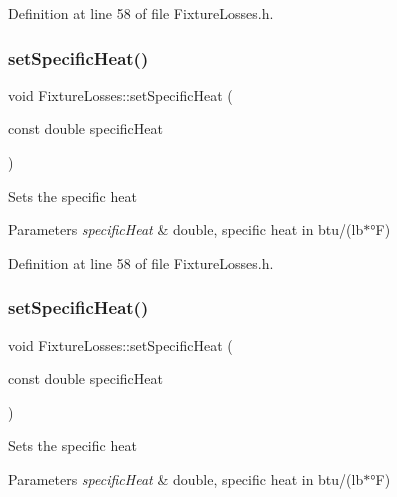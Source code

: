 Definition at line 58 of file Fixture\+Losses.\+h.

\mbox{\label{class_fixture_losses_a946e4b6da1cca9f27e57f97688499ee1}} 
\subsubsection{\texorpdfstring{set\+Specific\+Heat()}{setSpecificHeat()}\hspace{0.1cm}{\footnotesize\ttfamily [2/3]}}
{\footnotesize\ttfamily void Fixture\+Losses\+::set\+Specific\+Heat (\begin{DoxyParamCaption}\item[{const double}]{specific\+Heat }\end{DoxyParamCaption})\hspace{0.3cm}{\ttfamily [inline]}}

Sets the specific heat 
\begin{DoxyParams}{Parameters}
{\em specific\+Heat} & double, specific heat in btu/(lb$\ast$°F) \\
\hline
\end{DoxyParams}


Definition at line 58 of file Fixture\+Losses.\+h.

\mbox{\label{class_fixture_losses_a946e4b6da1cca9f27e57f97688499ee1}} 
\subsubsection{\texorpdfstring{set\+Specific\+Heat()}{setSpecificHeat()}\hspace{0.1cm}{\footnotesize\ttfamily [3/3]}}
{\footnotesize\ttfamily void Fixture\+Losses\+::set\+Specific\+Heat (\begin{DoxyParamCaption}\item[{const double}]{specific\+Heat }\end{DoxyParamCaption})\hspace{0.3cm}{\ttfamily [inline]}}

Sets the specific heat 
\begin{DoxyParams}{Parameters}
{\em specific\+Heat} & double, specific heat in btu/(lb$\ast$°F) \\
\hline
\end{DoxyParams}



